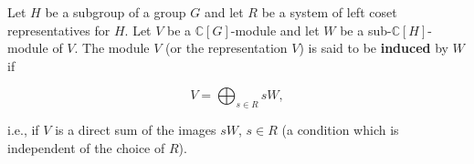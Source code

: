 Let $H$ be a subgroup of a group $G$ and let $R$ be a system of left coset representatives for $H$. Let $V$ be a $\mathbb{C}[G]$-module and let $W$ be a sub-$\mathbb{C}[H]$-module of $V$. The module $V$ (or the representation $V$) is said to be \textbf{induced} by $W$ if

$$V = \bigoplus_{s \in R} sW,$$

i.e., if $V$ is a direct sum of the images $sW$, $s \in R$ (a condition which is independent of the choice of $R$).
